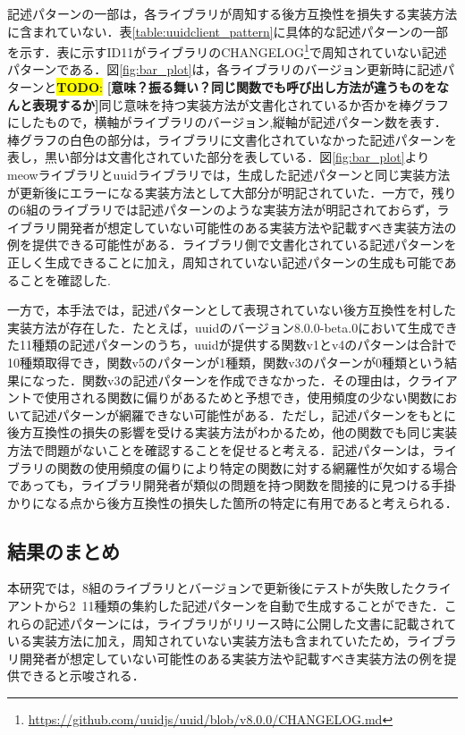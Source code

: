 \documentclass[11pt]{jreport}
\newcommand{\todo}[1]{\colorbox{yellow}{{\bf TODO}:}{\color{red} {\textbf{[#1]}}}}
\begin{document}
記述パターンの一部は，各ライブラリが周知する後方互換性を損失する実装方法に含まれていない．表\ref{table:uuidclient_pattern}に具体的な記述パターンの一部を示す．表に示すID11がライブラリのCHANGELOG\footnote{\url{https://github.com/uuidjs/uuid/blob/v8.0.0/CHANGELOG.md}}で周知されていない記述パターンである．図\ref{fig:bar_plot}は，各ライブラリのバージョン更新時に記述パターンと\todo{意味？振る舞い？同じ関数でも呼び出し方法が違うものをなんと表現するか}同じ意味を持つ実装方法が文書化されているか否かを棒グラフにしたもので，横軸がライブラリのバージョン,縦軸が記述パターン数を表す．棒グラフの白色の部分は，ライブラリに文書化されていなかった記述パターンを表し，黒い部分は文書化されていた部分を表している．図\ref{fig:bar_plot}よりmeowライブラリとuuidライブラリでは，生成した記述パターンと同じ実装方法が更新後にエラーになる実装方法として大部分が明記されていた．一方で，残りの6組のライブラリでは記述パターンのような実装方法が明記されておらず，ライブラリ開発者が想定していない可能性のある実装方法や記載すべき実装方法の例を提供できる可能性がある．ライブラリ側で文書化されている記述パターンを正しく生成できることに加え，周知されていない記述パターンの生成も可能であることを確認した.

一方で，本手法では，記述パターンとして表現されていない後方互換性を村した実装方法が存在した．たとえば，uuidのバージョン8.0.0-beta.0において生成できた11種類の記述パターンのうち，uuidが提供する関数v1とv4のパターンは合計で10種類取得でき，関数v5のパターンが1種類，関数v3のパターンが0種類という結果になった．関数v3の記述パターンを作成できなかった．その理由は，クライアントで使用される関数に偏りがあるためと予想でき，使用頻度の少ない関数において記述パターンが網羅できない可能性がある．ただし，記述パターンをもとに後方互換性の損失の影響を受ける実装方法がわかるため，他の関数でも同じ実装方法で問題がないことを確認することを促せると考える．記述パターンは，ライブラリの関数の使用頻度の偏りにより特定の関数に対する網羅性が欠如する場合であっても，ライブラリ開発者が類似の問題を持つ関数を間接的に見つける手掛かりになる点から後方互換性の損失した箇所の特定に有用であると考えられる．

\subsection{結果のまとめ}
本研究では，8組のライブラリとバージョンで更新後にテストが失敗したクライアントから2~11種類の集約した記述パターンを自動で生成することができた．これらの記述パターンには，ライブラリがリリース時に公開した文書に記載されている実装方法に加え，周知されていない実装方法も含まれていたため，ライブラリ開発者が想定していない可能性のある実装方法や記載すべき実装方法の例を提供できると示唆される．
\end{document}

